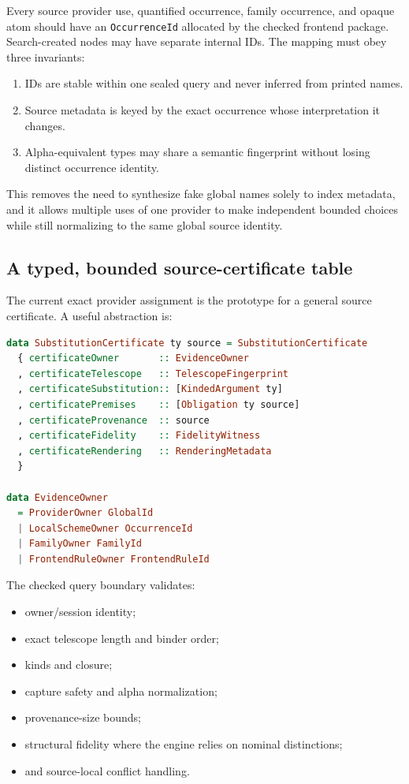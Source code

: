 \documentclass[11pt]{article}
\newcommand{\code}[1]{\texttt{#1}}
\begin{document}
Every source provider use, quantified occurrence, family occurrence, and
opaque atom should have an \code{OccurrenceId} allocated by the checked
frontend package.  Search-created nodes may have separate internal IDs.  The
mapping must obey three invariants:

\begin{enumerate}
  \item IDs are stable within one sealed query and never inferred from printed
    names.
  \item Source metadata is keyed by the exact occurrence whose interpretation
    it changes.
  \item Alpha-equivalent types may share a semantic fingerprint without losing
    distinct occurrence identity.
\end{enumerate}

This removes the need to synthesize fake global names solely to index metadata,
and it allows multiple uses of one provider to make independent bounded
choices while still normalizing to the same global source identity.

\subsection{A typed, bounded source-certificate table}
\label{sec:certificates}

The current exact provider assignment is the prototype for a general source
certificate.  A useful abstraction is:

\begin{lstlisting}[language=Haskell,caption={Generalized source-certified substitution evidence.}]
data SubstitutionCertificate ty source = SubstitutionCertificate
  { certificateOwner       :: EvidenceOwner
  , certificateTelescope   :: TelescopeFingerprint
  , certificateSubstitution:: [KindedArgument ty]
  , certificatePremises    :: [Obligation ty source]
  , certificateProvenance  :: source
  , certificateFidelity    :: FidelityWitness
  , certificateRendering   :: RenderingMetadata
  }

data EvidenceOwner
  = ProviderOwner GlobalId
  | LocalSchemeOwner OccurrenceId
  | FamilyOwner FamilyId
  | FrontendRuleOwner FrontendRuleId
\end{lstlisting}

The checked query boundary validates:

\begin{itemize}
  \item owner/session identity;
  \item exact telescope length and binder order;
  \item kinds and closure;
  \item capture safety and alpha normalization;
  \item provenance-size bounds;
  \item structural fidelity where the engine relies on nominal distinctions;
  \item and source-local conflict handling.
\end{itemize}
\end{document}
